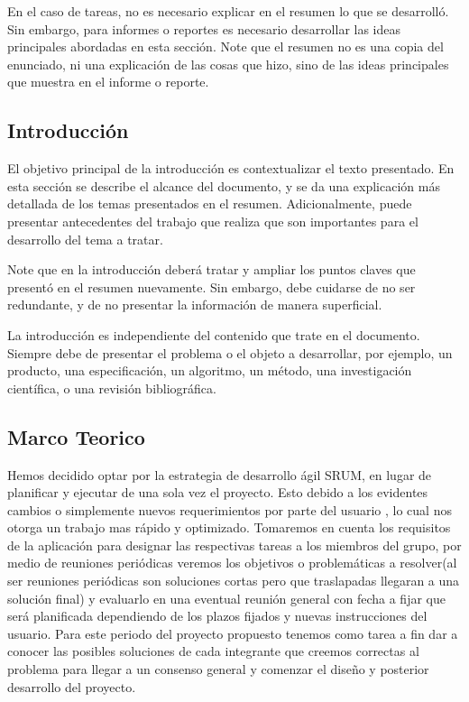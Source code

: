 \documentclass[twocolumn,11pts]{IEEEtran}
\begin{document}
En el caso de tareas, no es necesario explicar en el resumen lo que se desarrolló. Sin embargo, para informes o reportes es necesario desarrollar las ideas principales abordadas en esta sección. Note que el resumen no es una copia del enunciado, ni una explicación de las cosas que hizo, sino de las ideas principales que muestra en el informe o reporte.

\subsection{Introducción}
El objetivo principal de la introducción es contextualizar el texto presentado. En esta sección se describe el alcance del documento, y se da una explicación más detallada de los temas presentados en el resumen. Adicionalmente, puede presentar antecedentes del trabajo que realiza que son importantes para el desarrollo del tema a tratar.

Note que en la introducción deberá tratar y ampliar los puntos claves que presentó en el resumen nuevamente. Sin embargo, debe cuidarse de no ser redundante, y de no presentar la información de manera superficial.

La introducción es independiente del contenido que trate en el documento. Siempre debe de presentar el problema o el objeto a desarrollar, por ejemplo, un producto, una especificación, un algoritmo, un método, una investigación científica, o una revisión bibliográfica.
\subsection{Marco Teorico}
Hemos decidido optar por la estrategia de desarrollo ágil SRUM, en lugar de planificar y ejecutar de una sola vez el proyecto. Esto debido a los evidentes cambios o simplemente nuevos requerimientos por parte del usuario , lo cual nos otorga un trabajo mas rápido y optimizado.
Tomaremos en cuenta los requisitos de la aplicación para designar las respectivas tareas a los miembros del grupo, por medio de reuniones periódicas veremos los objetivos o problemáticas a resolver(al ser reuniones periódicas son soluciones cortas pero que traslapadas llegaran a una solución final) y evaluarlo en una eventual reunión general con fecha a fijar que será planificada dependiendo de los plazos fijados y nuevas instrucciones del usuario.
Para este periodo del proyecto propuesto tenemos como tarea a fin dar a conocer las posibles soluciones de cada integrante que creemos correctas al problema para llegar a un consenso general y comenzar el diseño y posterior desarrollo del proyecto.
\end{document}
